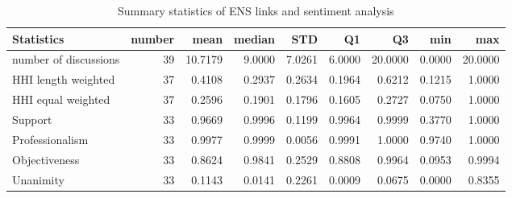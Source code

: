 \documentclass{article}
\begin{document}
\begin{table}[ht]
    \centering
    \small
\begin{tabular}{lrrrrrrrr}
\toprule
Statistics & number & mean & median & STD & Q1 & Q3 & min & max \\
\midrule
number of discussions & 39 & 10.7179 & 9.0000 & 7.0261 & 6.0000 & 20.0000 & 0.0000 & 20.0000 \\
HHI length weighted & 37 & 0.4108 & 0.2937 & 0.2634 & 0.1964 & 0.6212 & 0.1215 & 1.0000 \\
HHI equal weighted & 37 & 0.2596 & 0.1901 & 0.1796 & 0.1605 & 0.2727 & 0.0750 & 1.0000 \\
\midrule
Support & 33 & 0.9669 & 0.9996 & 0.1199 & 0.9964 & 0.9999 & 0.3770 & 1.0000 \\
Professionalism & 33 & 0.9977 & 0.9999 & 0.0056 & 0.9991 & 1.0000 & 0.9740 & 1.0000 \\
Objectiveness & 33 & 0.8624 & 0.9841 & 0.2529 & 0.8808 & 0.9964 & 0.0953 & 0.9994 \\
Unanimity & 33 & 0.1143 & 0.0141 & 0.2261 & 0.0009 & 0.0675 & 0.0000 & 0.8355 \\
\bottomrule
\end{tabular}
    \caption{Summary statistics of ENS links and sentiment analysis}
\end{table}
\end{document}
